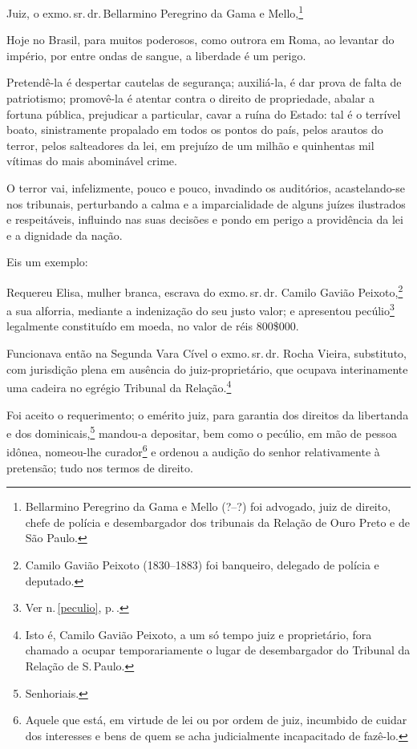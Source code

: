 Juiz, o exmo.\,sr.\,dr.\,Bellarmino Peregrino da Gama e
Mello,\footnote{Bellarmino Peregrino da Gama e Mello (?--?) foi \label{bellarmino}
  advogado, juiz de direito, chefe de polícia e desembargador dos
  tribunais da Relação de Ouro Preto e de São Paulo.}

Hoje no Brasil, para muitos poderosos, como outrora em Roma, ao levantar
do império, por entre ondas de sangue, a liberdade é um perigo.

Pretendê-la é despertar cautelas de segurança; auxiliá-la, é dar prova
de falta de patriotismo; promovê-la é atentar contra o direito de
propriedade, abalar a fortuna pública, prejudicar a particular, cavar a
ruína do Estado: tal é o terrível boato, sinistramente propalado em
todos os pontos do país, pelos arautos do terror, pelos salteadores da
lei, em prejuízo de um milhão e quinhentas mil vítimas do mais
abominável crime.

O terror vai, infelizmente, pouco e pouco, invadindo os auditórios,
acastelando-se nos tribunais, perturbando a calma e a imparcialidade de
alguns juízes ilustrados e respeitáveis, influindo nas suas decisões e
pondo em perigo a providência da lei e a dignidade da nação.

Eis um exemplo:

Requereu Elisa, mulher branca, escrava do exmo.\,sr.\,dr. Camilo Gavião Peixoto,\footnote{Camilo Gavião Peixoto (1830--1883) foi banqueiro,
  delegado de polícia e deputado.} a sua alforria, mediante a
indenização do seu justo valor; e apresentou pecúlio\footnote{
  Ver n.\,\ref{peculio}, p.\,\pageref{peculio}.} legalmente constituído em moeda,
no valor de réis 800\$000.

Funcionava então na Segunda Vara Cível o exmo.\,sr.\,dr. Rocha Vieira,
substituto, com jurisdição plena em ausência do juiz-proprietário, que
ocupava interinamente uma cadeira no egrégio Tribunal da
Relação.\footnote{Isto é, Camilo Gavião Peixoto, a um só tempo juiz e
  proprietário, fora chamado a ocupar temporariamente o lugar de
  desembargador do Tribunal da Relação de S.\,Paulo.}

Foi aceito o requerimento; o emérito juiz, para garantia dos direitos da
libertanda e dos dominicais,\footnote{Senhoriais.} mandou-a depositar,
bem como o pecúlio, em mão de pessoa idônea, nomeou-lhe
curador\footnote{Aquele que está, em virtude de lei ou por ordem de
  juiz, incumbido de cuidar dos interesses e bens de quem se acha
  judicialmente incapacitado de fazê-lo.} e ordenou a audição do senhor
relativamente à pretensão; tudo nos termos de direito.

